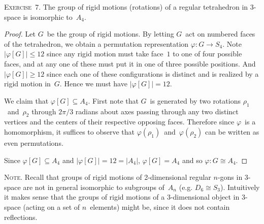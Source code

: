 \documentclass[letterpaper]{article}
\newcommand{\exercise}[1]{\goodbreak\noindent\textsc{Exercise~{#1}.}}
\newcommand{\note}{\goodbreak\noindent\textsc{Note.}}
\newcommand{\iso}{\cong}
\newcommand{\ord}[1]{|{#1}|}
\begin{document}
\exercise{7}
The group of rigid motions (rotations) of a regular tetrahedron in 3-space is isomorphic to~$A_4$.
\begin{proof}
Let $G$~be the group of rigid motions. By letting $G$~act on numbered faces of the tetrahedron, we obtain a permutation representation $\varphi:G\to S_4$. Note $\ord{\varphi[G]}\le 12$ since any rigid motion must take face~$1$ to one of four possible faces, and at any one of these must put it in one of three possible positions. And $\ord{\varphi[G]}\ge 12$ since each one of these configurations is distinct and is realized by a rigid motion in~$G$. Hence we must have $\ord{\varphi[G]}=12$.

We claim that $\varphi[G]\subseteq A_4$. First note that $G$~is generated by two rotations $\rho_1$~and~$\rho_2$ through $2\pi/3$ radians about axes passing through any two distinct vertices and the centers of their respective opposing faces. Therefore since $\varphi$~is a homomorphism, it suffices to observe that $\varphi(\rho_1)$~and~$\varphi(\rho_2)$ can be written as even permutations.

Since $\varphi[G]\subseteq A_4$ and $\ord{\varphi[G]}=12=\ord{A_4}$, $\varphi[G]=A_4$ and so $\varphi:G\iso A_4$.
\end{proof}
\note
Recall that groups of rigid motions of 2-dimensional regular $n$-gons in 3-space are not in general isomorphic to subgroups of~$A_n$ (e.g. $D_6\iso S_3$). Intuitively it makes sense that the groups of rigid motions of a 3-dimensional object in 3-space (acting on a set of $n$~elements) might be, since it does not contain reflections.
\end{document}
